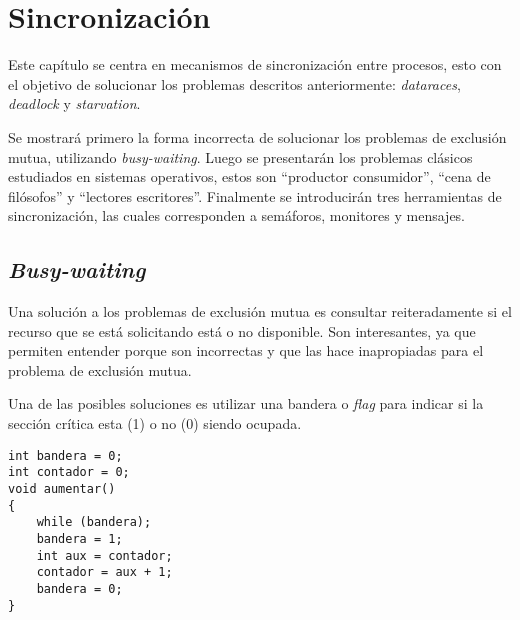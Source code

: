%
%
%
%


\chapter{Sincronización}
\label{sincronizacion}

Este capítulo se centra en mecanismos de sincronización entre procesos, esto
con el objetivo de solucionar los problemas descritos anteriormente:
\emph{dataraces}, \emph{deadlock} y \emph{starvation}.

Se mostrará primero la forma incorrecta de solucionar los problemas de exclusión
mutua, utilizando \emph{busy-waiting}. Luego se presentarán los problemas
clásicos estudiados en sistemas operativos, estos son ``productor consumidor'',
``cena de filósofos'' y ``lectores escritores''. Finalmente se introducirán tres
herramientas de sincronización, las cuales corresponden a semáforos, monitores y
mensajes.

\section{\emph{Busy-waiting}}
Una solución a los problemas de exclusión mutua es consultar reiteradamente si
el recurso que se está solicitando está o no disponible. Son interesantes, ya
que permiten entender porque son incorrectas y que las hace inapropiadas para el
problema de exclusión mutua.

Una de las posibles soluciones es utilizar una bandera o \emph{flag} para
indicar si la sección crítica esta (1) o no (0) siendo ocupada.

\begin{lstlisting}
int bandera = 0;
int contador = 0;
void aumentar()
{
	while (bandera);
	bandera = 1;
	int aux = contador;
	contador = aux + 1;
	bandera = 0;
}
\end{lstlisting}

